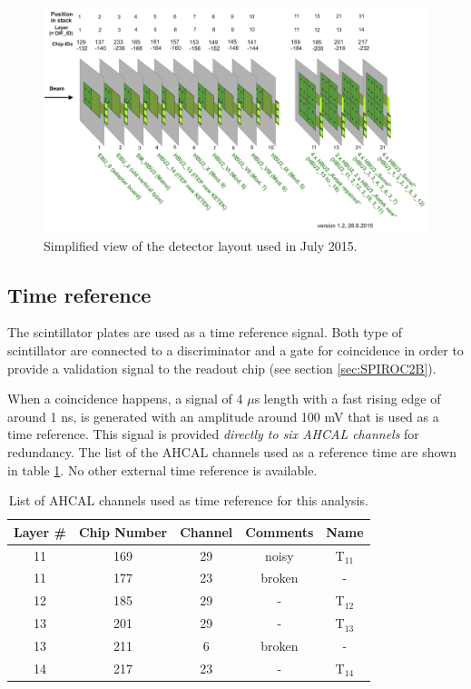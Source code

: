 \begin{figure}[htbp!]
	\centering
	\includegraphics[width=0.7\linewidth]{chap5/fig_EnergyCalib/Detector_layout_copy.png}
	\caption{Simplified view of the detector layout used in July 2015.} \label{fig:Det_layout}
\end{figure}

\subsection{Time reference}
\label{subsec:trigger}

The scintillator plates are used as a time reference signal. Both type of scintillator are connected to a discriminator and a gate for coincidence in order to provide a validation signal to the readout chip (see section \ref{sec:SPIROC2B}).

When a coincidence happens, a signal of 4 $\mu$s length with a fast rising edge of around 1 ns, is generated with an amplitude around 100 mV that is used as a time reference. This signal is provided \textit{directly to six AHCAL channels} for redundancy. The list of the AHCAL channels used as a reference time are shown in table \ref{table:trigger_signal_list}. No other external time reference is available.

\begin{table}[htb!]
	\centering
	\caption{List of AHCAL channels used as time reference for this analysis.}
	\label{table:trigger_signal_list}
	\begin{tabular}{@{} ccccc @{}}
		\toprule
		Layer \# & Chip Number & Channel & Comments & Name \\
		\midrule
		11 & 169 & 29 & noisy & T$_{11}$ \\
		11 & 177 & 23 & broken & - \\
		12 & 185 & 29 & - & T$_{12}$ \\
		13 & 201 & 29 & -  & T$_{13}$ \\
		13 & 211 & 6 & broken & - \\
		14 & 217 & 23 & - & T$_{14}$ \\
		\bottomrule
	\end{tabular}
\end{table}


